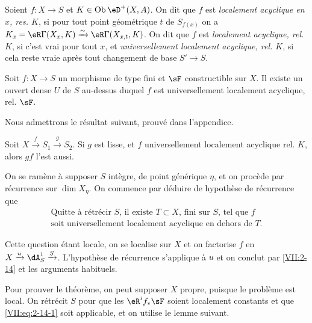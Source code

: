 \begin{definition_}\label{VII:2-12}
Soient $f:X\to S$ et $K\in \ob\eD^+(X,A)$. On dit que $f$ est \emph{localement 
acyclique en $x$, res. $K$}, si pour tout point géométrique $t$ de 
$S_{f(x)}$ on a $K_x=\eR\Gamma(X_x,K)\iso \eR\Gamma(X_{x,t},K)$. On dit que $f$ 
est \emph{localement acyclique, rel. $K$}, si c'est vrai pour tout $x$, et 
\emph{universellement localement acyclique, rel. $K$}, si cela reste vraie 
après tout changement de base $S' \to S$.
\end{definition_}





\begin{theorem_}\label{VII:2-13}
Soit $f:X\to S$ un morphisme de type fini et $\sF$ constructible sur $X$. Il 
existe un ouvert dense $U$ de $S$ au-dessus duquel $f$ est universellement 
localement acyclique, rel. $\sF$. 
\end{theorem_}

Nous admettrons le résultat suivant, prouvé dans l'appendice. 





\begin{lemma_}\label{VII:2-14}
Soit $X\xrightarrow f S_1 \xrightarrow g S_2$. Si $g$ est lisse, et $f$ 
universellement localement acyclique rel. $K$, alors $g f$ l'est aussi. 
\end{lemma_}

On se ramène à supposer $S$ intègre, de point générique $\eta$, et 
on procède par récurrence sur $\dim{X_\eta}$. On commence par déduire de 
hypothèse de récurrence que 
\begin{equation*}\tag{A}\label{VII:eq:2-14-1}
  \begin{array}{c}
    \text{Quitte à rétrécir $S$, il existe $T\subset X$, fini sur $S$, tel que $f$} \\
    \text{soit universellement localement acyclique en dehors de $T$.} 
  \end{array}
\end{equation*}

Cette question étant locale, on se localise sur $X$ et on factorise $f$ en 
$X\xrightarrow u \dA_S^1 \xrightarrow S$. L'hypothèse de récurrence 
s'applique à $u$ et on conclut par \ref{VII:2-14} et les arguments habituels. 

Pour prouver le théorème, on peut supposer $X$ propre, puisque le 
problème est local. On rétrécit $S$ pour que les $\eR^i f_\ast \sF$ 
soient localement constants et que \eqref{VII:eq:2-14-1} soit applicable, et on 
utilise le lemme suivant. 





